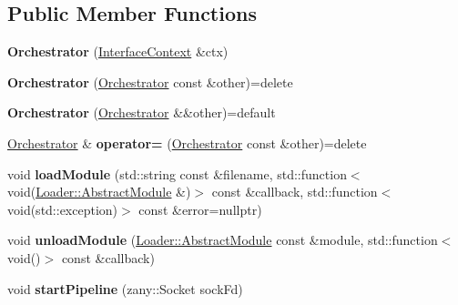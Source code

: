 \subsection*{Public Member Functions}
\begin{DoxyCompactItemize}
\item 
\mbox{\label{classzany_1_1_orchestrator_a863740f95beb0c6d0aca5c0cc776e188}} 
{\bfseries Orchestrator} (\hyperlink{classzany_1_1_interface_context}{Interface\+Context} \&ctx)
\item 
\mbox{\label{classzany_1_1_orchestrator_ab650f7433644127102aeafa2147b3612}} 
{\bfseries Orchestrator} (\hyperlink{classzany_1_1_orchestrator}{Orchestrator} const \&other)=delete
\item 
\mbox{\label{classzany_1_1_orchestrator_a1c36dbeec07bdf6f0fd1ec8af287e0ec}} 
{\bfseries Orchestrator} (\hyperlink{classzany_1_1_orchestrator}{Orchestrator} \&\&other)=default
\item 
\mbox{\label{classzany_1_1_orchestrator_a45ab309873c55c3d2aaf03da1526cc88}} 
\hyperlink{classzany_1_1_orchestrator}{Orchestrator} \& {\bfseries operator=} (\hyperlink{classzany_1_1_orchestrator}{Orchestrator} const \&other)=delete
\item 
\mbox{\label{classzany_1_1_orchestrator_a0a333207be787a9ee7501ac8761c1683}} 
void {\bfseries load\+Module} (std\+::string const \&filename, std\+::function$<$ void(\hyperlink{classzany_1_1_loader_1_1_abstract_module}{Loader\+::\+Abstract\+Module} \&)$>$ const \&callback, std\+::function$<$ void(std\+::exception)$>$ const \&error=nullptr)
\item 
\mbox{\label{classzany_1_1_orchestrator_ad223b78e8fda153d67af3aa4d2cc5054}} 
void {\bfseries unload\+Module} (\hyperlink{classzany_1_1_loader_1_1_abstract_module}{Loader\+::\+Abstract\+Module} const \&module, std\+::function$<$ void()$>$ const \&callback)
\item 
\mbox{\label{classzany_1_1_orchestrator_acc6be702fde2a6e29ef1a823b052b9b8}} 
void {\bfseries start\+Pipeline} (zany\+::\+Socket sock\+Fd)

\end{DoxyCompactItemize}
